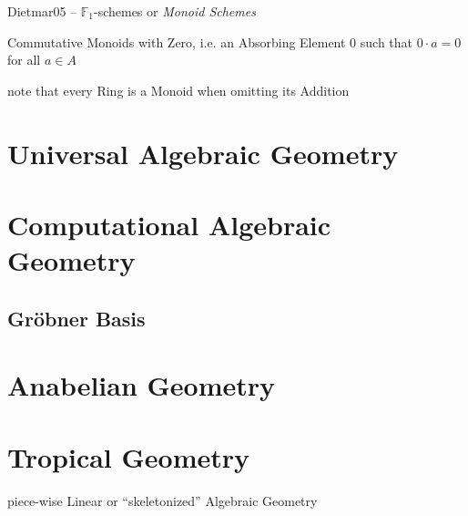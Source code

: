 Dietmar05 -- $\mathbb{F}_1$-schemes or \emph{Monoid Schemes}

Commutative Monoids with Zero, i.e. an Absorbing Element $0$ such that $0 \cdot
a = 0$ for all $a \in A$

note that every Ring is a Monoid when omitting its Addition



\section{Universal Algebraic Geometry}\label{sec:universal_geometry}

\section{Computational Algebraic Geometry}
\label{sec:computational_algebraic_geometry}

\subsection{Gr\"obner Basis}\label{sec:grobner_basis}\hfill




\section{Anabelian Geometry}\label{sec:anabelian_geometry}

\section{Tropical Geometry}\label{sec:tropical_geometry}

piece-wise Linear or ``skeletonized'' Algebraic Geometry

